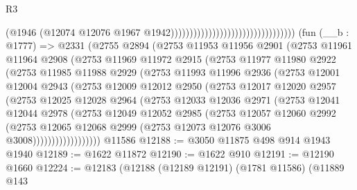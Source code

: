 \begin{lexlean}{R3}
\begin{coremodule}
                                                                  (@1946
                                                                    (@12074
                                                                      @12076
                                                                      @1967
                                                                      @1942)))))))))))))))))))))))))))))))))
    (fun (__b : @1777) =>
    @2331
      (@2755
        @2894
        (@2753
          @11953
          @11956
          @2901
          (@2753
            @11961
            @11964
            @2908
            (@2753
              @11969
              @11972
              @2915
              (@2753
                @11977
                @11980
                @2922
                (@2753
                  @11985
                  @11988
                  @2929
                  (@2753
                    @11993
                    @11996
                    @2936
                    (@2753
                      @12001
                      @12004
                      @2943
                      (@2753
                        @12009
                        @12012
                        @2950
                        (@2753
                          @12017
                          @12020
                          @2957
                          (@2753
                            @12025
                            @12028
                            @2964
                            (@2753
                              @12033
                              @12036
                              @2971
                              (@2753
                                @12041
                                @12044
                                @2978
                                (@2753
                                  @12049
                                  @12052
                                  @2985
                                  (@2753
                                    @12057
                                    @12060
                                    @2992
                                    (@2753
                                      @12065
                                      @12068
                                      @2999
                                      (@2753 @12073 @12076 @3006 @3008))))))))))))))))))
    @11586
@12188 := @3050 @11875 @498 @914 @1943 @1940
@12189 := @1622 @11872
@12190 := @1622 @910
@12191 := @12190 @1660
@12224 := @12183
    (@12188
      (@12189 @12191)
      (@1781 @11586)
      (@11889
        @143

\end{coremodule}
\end{lexlean}
